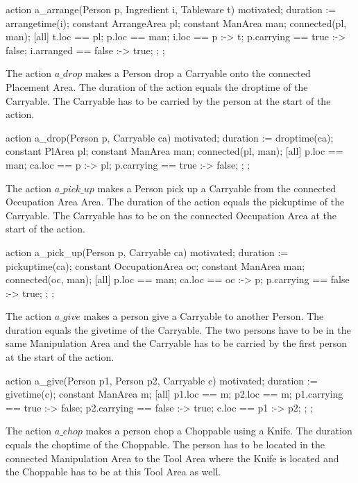 \begin{anmlcode}
action a_arrange(Person p, Ingredient i, Tableware t) {
  motivated;
  duration := arrangetime(i);
  constant ArrangeArea pl;
  constant ManArea man;
  connected(pl, man);
  [all] {
    t.loc == pl;
    p.loc == man;
    i.loc == p :-> t;
    p.carrying == true :-> false;
    i.arranged == false :-> true;
  };
};
\end{anmlcode}

The action $a\_drop$ makes a Person drop a Carryable onto the connected Placement Area.
The duration of the action equals the droptime of the Carryable.
The Carryable has to be carried by the person at the start of the action.

\begin{anmlcode}
action a_drop(Person p, Carryable ca) {
  motivated;
  duration := droptime(ca);
  constant PlArea pl;
  constant ManArea man;
  connected(pl, man);
  [all] {
    p.loc == man;
    ca.loc == p :-> pl;
    p.carrying == true :-> false;
  };
};
\end{anmlcode}

The action $a\_pick\_up$ makes a Person pick up a Carryable from the connected Occupation Area Area.
The duration of the action equals the pickuptime of the Carryable.
The Carryable has to be on the connected Occupation Area at the start of the action.

\begin{anmlcode}
action a_pick_up(Person p, Carryable ca) {
  motivated;
  duration := pickuptime(ca);
  constant OccupationArea oc;
  constant ManArea man;
  connected(oc, man);
  [all] {
    p.loc == man;
    ca.loc == oc :-> p; 
    p.carrying == false :-> true;
  };
};
\end{anmlcode}

The action $a\_give$ makes a person give a Carryable to another Person.
The duration equals the givetime of the Carryable.
The two persons have to be in the same Manipulation Area and the Carryable has to be carried by the first person at the start of the action.

\begin{anmlcode}
action a_give(Person p1, Person p2, Carryable c) {
  motivated;
  duration := givetime(c);
  constant ManArea m;
  [all] {
    p1.loc == m;
    p2.loc == m;
    p1.carrying == true :-> false;
    p2.carrying == false :-> true;
    c.loc == p1 :-> p2;
  };
};
\end{anmlcode}

The action $a\_chop$ makes a person chop a Choppable using a Knife.
The duration equals the choptime of the Choppable.
The person has to be located in the connected Manipulation Area to the Tool Area where the Knife is located and the Choppable has to be at this Tool Area as well.

